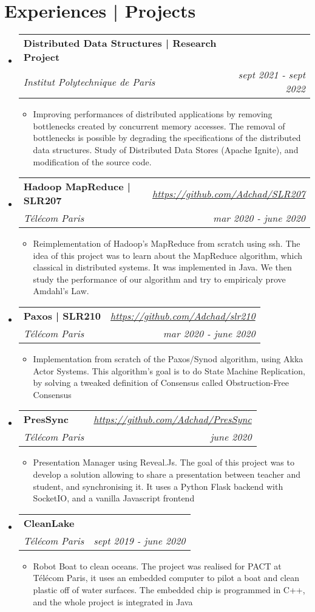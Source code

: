 \documentclass[a4paper,20pt]{article}
\makeatletter
\newcommand{\resumeItemWithoutTitle}[1]{
  \item\small{
    {\vspace{-2pt}#1}
  }
}
\newcommand{\resumeSubheading}[4]{
  \vspace{-1pt}\item
    \begin{tabular*}{0.97\textwidth}{l@{\extracolsep{\fill}}r}
      \textbf{#1} & #2 \\
      \textit{#3} & \textit{#4} \\
    \end{tabular*}\vspace{-5pt}
}
\newcommand{\resumeSubHeadingListStart}{\begin{itemize}[leftmargin=*]}
\newcommand{\resumeSubHeadingListEnd}{\end{itemize}}
\newcommand{\resumeItemListStart}{\begin{itemize}}
\newcommand{\resumeItemListEnd}{\end{itemize}\vspace{-5pt}}
\makeatother
\begin{document}
\section{Experiences | Projects}
 \resumeSubHeadingListStart
  \resumeSubheading
  {Distributed Data Structures | Research Project}{ }
  {Institut Polytechnique de Paris}{sept 2021 - sept 2022}
   \resumeItemListStart 
    \resumeItemWithoutTitle
    {Improving performances of distributed applications by removing bottlenecks created by concurrent memory accesses. The removal of bottlenecks is possible by degrading the specifications of the distributed data structures. Study of Distributed Data Stores (Apache Ignite), and modification of the source code. }
   \resumeItemListEnd 
  \resumeSubheading
  {Hadoop MapReduce | SLR207}{\textit{\href{https://github.com/Adchad/SLR207}{https://github.com/Adchad/SLR207}}}
  {Télécom Paris}{mar 2020 - june 2020 }
   \resumeItemListStart 
    \resumeItemWithoutTitle
    {Reimplementation of Hadoop's MapReduce from scratch using ssh. The idea of this project was to learn about the MapReduce algorithm, which classical in distributed systems. It was implemented in Java. We then study the performance of our algorithm and try to empiricaly prove Amdahl's Law. }
   \resumeItemListEnd 
  \resumeSubheading
  {Paxos | SLR210}{\textit{\href{https://github.com/Adchad/slr220}{https://github.com/Adchad/slr210}}}
  {Télécom Paris}{mar 2020 - june 2020 }
   \resumeItemListStart 
    \resumeItemWithoutTitle
    {Implementation from scratch of the Paxos/Synod algorithm, using Akka Actor Systems. This algorithm's goal is to do State Machine Replication, by solving a tweaked definition of Consensus called Obstruction-Free Consensus}
   \resumeItemListEnd 
  \resumeSubheading
  {PresSync}{\textit{\href{https://github.com/Adchad/PresSync}{https://github.com/Adchad/PresSync}}}
  {Télécom Paris}{june 2020}
   \resumeItemListStart 
    \resumeItemWithoutTitle
    {Presentation Manager using Reveal.Js. The goal of this project was to develop a solution allowing to share a presentation between teacher and student, and synchronising it. It uses a Python Flask backend with SocketIO, and a vanilla Javascript frontend}
   \resumeItemListEnd 
  \resumeSubheading
  {CleanLake}{ }
  {Télécom Paris}{sept 2019 - june 2020}
   \resumeItemListStart 
    \resumeItemWithoutTitle
    {Robot Boat to clean oceans. The project was realised for PACT at Télécom Paris, it uses an embedded computer to pilot a boat and clean plastic off of water surfaces. The embedded chip is programmed in C++, and the whole project is integrated in Java}
   \resumeItemListEnd 
 \resumeSubHeadingListEnd
\end{document}
